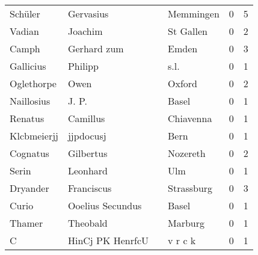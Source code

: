 \begin{center}
\begin{tiny}
\begin{longtabu}{llllrr}
                  Schüler &                          Gervasius &             &                                   Memmingen &          0 &         5 \\
                   Vadian &                            Joachim &             &                                   St Gallen &          0 &         2 \\
                    Camph &                        Gerhard zum &             &                                       Emden &          0 &         3 \\
                Gallicius &                            Philipp &             &                                        s.l. &          0 &         1 \\
               Oglethorpe &                               Owen &             &                                      Oxford &          0 &         2 \\
               Naillosius &                              J. P. &             &                                       Basel &          0 &         1 \\
                  Renatus &                           Camillus &             &                                   Chiavenna &          0 &         1 \\
              Klcbmeierjj &                          jjpdocusj &             &                                        Bern &          0 &         1 \\
                 Cognatus &                          Gilbertus &             &                                    Nozereth &          0 &         2 \\
                    Serin &                           Leonhard &             &                                         Ulm &          0 &         1 \\
                 Dryander &                         Franciscus &             &                                  Strassburg &          0 &         3 \\
                    Curio &                   Ooelius Secundus &             &                                       Basel &          0 &         1 \\
                   Thamer &                           Theobald &             &                                     Marburg &          0 &         1 \\
                        C &                   HinCj PK HenrfcU &             &                                     v r c k &          0 &         1 \\

\end{longtabu}
\end{tiny}
\end{center}
